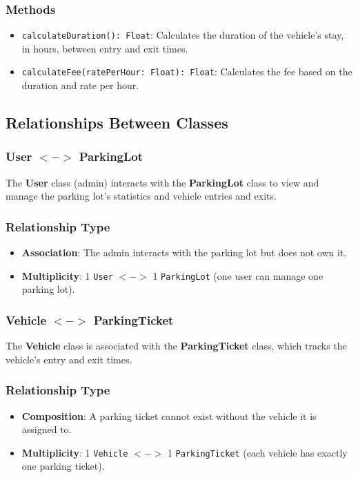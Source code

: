 \subsubsection*{Methods}
\begin{itemize}
    \item \texttt{calculateDuration(): Float}: Calculates the duration of the vehicle's stay, in hours, between entry and exit times.
    \item \texttt{calculateFee(ratePerHour: Float): Float}: Calculates the fee based on the duration and rate per hour.
\end{itemize}

\subsection{Relationships Between Classes}

\subsubsection{User $<->$ ParkingLot}
The \textbf{User} class (admin) interacts with the \textbf{ParkingLot} class to view and manage the parking lot's statistics and vehicle entries and exits.

\subsubsection*{Relationship Type}
\begin{itemize}
    \item \textbf{Association}: The admin interacts with the parking lot but does not own it.
    \item \textbf{Multiplicity}: 1 \texttt{User} $<->$ 1 \texttt{ParkingLot} (one user can manage one parking lot).
\end{itemize}

\subsubsection{Vehicle $<->$ ParkingTicket}
The \textbf{Vehicle} class is associated with the \textbf{ParkingTicket} class, which tracks the vehicle's entry and exit times.

\subsubsection*{Relationship Type}
\begin{itemize}
    \item \textbf{Composition}: A parking ticket cannot exist without the vehicle it is assigned to.
    \item \textbf{Multiplicity}: 1 \texttt{Vehicle} $<->$ 1 \texttt{ParkingTicket} (each vehicle has exactly one parking ticket).
\end{itemize}

